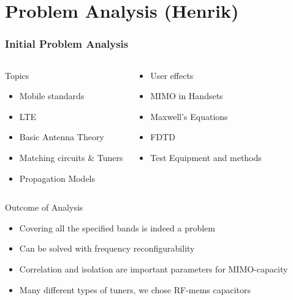 \section[Problem Analysis]{Problem Analysis (Henrik)}
\begin{frame}[fragile]
    \frametitle{Initial Problem Analysis}
    \vspace*{-0.5cm}
    \begin{columns}[onlytextwidth,t]
    \begin{block}{Topics}
          \begin{itemize}
          \item Mobile standards
          \item LTE
          \item Basic Antenna Theory
          \item Matching circuits \& Tuners
          \item Propagation Models
          \end{itemize}
    \end{block}
    \begin{block}{}
          \begin{itemize}
          \item User effects
          \item MIMO in Handsets
          \item Maxwell's Equations
          \item FDTD 
          \item Test Equipment and methods
          \end{itemize}
    \end{block}
    \end{columns}
    \begin{block}{Outcome of Analysis}
      \begin{itemize}
      \item Covering all the specified bands is indeed a problem
      \item Can be solved with frequency reconfigurability
      \item Correlation and isolation are important parameters for MIMO-capacity
      \item Many different types of tuners, we chose RF-mems capacitors
      \end{itemize}
    \end{block}
\end{frame}

